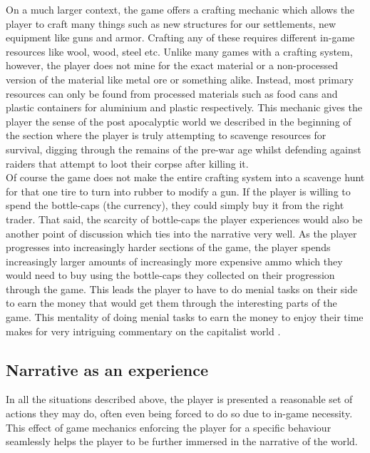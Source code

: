 \documentclass[12pt, conference]{IEEEtran}
\begin{document}
On a much larger context, the game offers a crafting mechanic which allows the player to craft many things such as new structures for our settlements, new equipment like guns and armor. Crafting any of these requires different in-game resources like wool, wood, steel etc. Unlike many games with a crafting system, however, the player does not mine for the exact material or a non-processed version of the material like metal ore or something alike. Instead, most primary resources can only be found from processed materials such as food cans and plastic containers for aluminium and plastic respectively. This mechanic gives the player the sense of the post apocalyptic world we described in the beginning of the section where the player is truly attempting to scavenge resources for survival, digging through the remains of the pre-war age whilst defending against raiders that attempt to loot their corpse after killing it.\\

Of course the game does not make the entire crafting system into a scavenge hunt for that one tire to turn into rubber to modify a gun. If the player is willing to spend the bottle-caps (the currency), they could simply buy it from the right trader. That said, the scarcity of bottle-caps the player experiences would also be another point of discussion which ties into the narrative very well. As the player progresses into increasingly harder sections of the game, the player spends increasingly larger amounts of increasingly more expensive ammo which they would need to buy using the bottle-caps they collected on their progression through the game. This leads the player to have to do menial tasks on their side to earn the money that would get them through the interesting parts of the game. This mentality of doing menial tasks to earn the money to enjoy their time makes for very intriguing commentary on the capitalist world \cite{bogost}.\\

\subsection{Narrative as an experience}

In all the situations described above, the player is presented a reasonable set of actions they may do, often even being forced to do so due to in-game necessity. This effect of game mechanics enforcing the player for a specific behaviour seamlessly helps the player to be further immersed in the narrative of the world.\\
\end{document}
